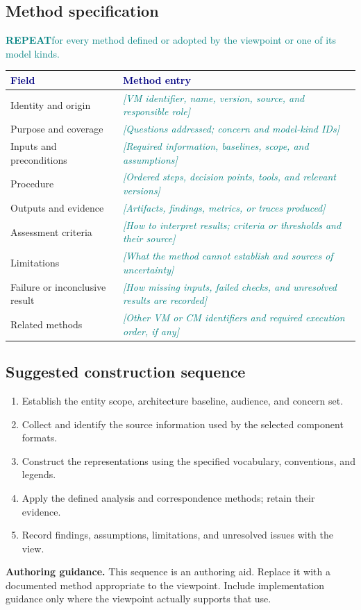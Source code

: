 \documentclass[11pt,letterpaper]{article}
\newcommand{\FillIn}[1]{\textcolor{Teal}{\sffamily\itshape[#1]}}
\newcommand{\TableHead}[1]{\textcolor{Navy}{\sffamily\bfseries#1}}
\newcommand{\Repeat}[1]{\textcolor{Teal}{\sffamily\small\textbf{REPEAT}\enspace #1}\par}
\newcommand{\Guide}[1]{\par{\small\textcolor{Muted}{\textbf{Authoring guidance.} #1}}\par}
\begin{document}
\subsection{Method specification}
\Repeat{for every method defined or adopted by the viewpoint or one of its model kinds.}
{\small
\begin{tabularx}{\linewidth}{@{}L{1.47in}Y@{}}
\toprule
\TableHead{Field} & \TableHead{Method entry}\\
\midrule
Identity and origin & \FillIn{VM identifier, name, version, source, and responsible role}\\
Purpose and coverage & \FillIn{Questions addressed; concern and model-kind IDs}\\
Inputs and preconditions & \FillIn{Required information, baselines, scope, and assumptions}\\
Procedure & \FillIn{Ordered steps, decision points, tools, and relevant versions}\\
Outputs and evidence & \FillIn{Artifacts, findings, metrics, or traces produced}\\
Assessment criteria & \FillIn{How to interpret results; criteria or thresholds and their source}\\
Limitations & \FillIn{What the method cannot establish and sources of uncertainty}\\
Failure or inconclusive result & \FillIn{How missing inputs, failed checks, and unresolved results are recorded}\\
Related methods & \FillIn{Other VM or CM identifiers and required execution order, if any}\\
\bottomrule
\end{tabularx}}

\subsection{Suggested construction sequence}
\begin{enumerate}
\item Establish the entity scope, architecture baseline, audience, and concern set.
\item Collect and identify the source information used by the selected component formats.
\item Construct the representations using the specified vocabulary, conventions, and legends.
\item Apply the defined analysis and correspondence methods; retain their evidence.
\item Record findings, assumptions, limitations, and unresolved issues with the view.
\end{enumerate}
\Guide{This sequence is an authoring aid. Replace it with a documented method
appropriate to the viewpoint. Include implementation guidance only where the
viewpoint actually supports that use.}
\end{document}
